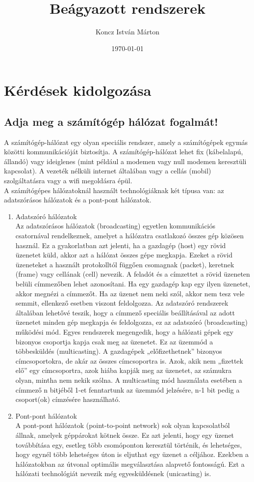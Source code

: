 \documentclass[12pt, a4paper]{article}
\begin{document}
\title{Beágyazott rendszerek}
\author{Koncz István Márton}
\date{\today}
\maketitle
\newpage

\section{Kérdések kidolgozása}
\subsection{Adja meg a számítógép hálózat fogalmát!}
A számítógép-hálózat egy olyan speciális rendszer, amely a számítógépek egymás közötti kommunikációját biztosítja. A számítógép-hálózat lehet fix (kábelalapú, állandó) vagy ideiglenes (mint például a modemen vagy null modemen keresztüli kapcsolat). A vezeték nélküli internet általában vagy a cellás (mobil) szolgáltatásra vagy a wifi megoldásra épül.\\
A számítógépes hálózatoknál használt technológiáknak két típusa van: az adatszórásos hálózatok és a pont-pont hálózatok.
\begin{enumerate}
\item
Adatszóró hálózatok\\
Az adatszórásos hálózatok (broadcasting) egyetlen kommunikációs csatornával rendelkeznek, amelyet a hálózatra csatlakozó összes gép közösen használ. Ez a gyakorlatban azt jelenti, ha a gazdagép (host) egy rövid üzenetet küld, akkor azt a hálózat összes gépe megkapja. Ezeket a rövid üzeneteket a használt protokolltól függően csomagnak (packet), keretnek (frame) vagy cellának (cell) nevezik. A feladót és a címzettet a rövid üzeneten belüli címmezőben lehet azonosítani. Ha egy gazdagép kap egy ilyen üzenetet, akkor megnézi a címmezőt. Ha az üzenet nem neki szól, akkor nem tesz vele semmit, ellenkező esetben viszont feldolgozza. Az adatszóró rendszerek általában lehetővé teszik, hogy a címmező speciális beállításával az adott üzenetet minden gép megkapja és feldolgozza, ez az adatszóró (broadcasting) működési mód. Egyes rendszerek megengedik, hogy a hálózati gépek egy bizonyos csoportja kapja csak meg az üzenetet. Ez az üzemmód a többesküldés (multicasting). A gazdagépek „előfizethetnek” bizonyos címcsoportokra, de akár az összes címcsoportra is. Azok, akik nem „fizettek elő” egy címcsoportra, azok hiába kapják meg az üzenetet, az számukra olyan, mintha nem nekik szólna. A multicasting mód használata esetében a címmező n bitjéből 1-et fenntartunk az üzemmód jelzésére, n-1 bit pedig a csoport(ok) címzésére használható.
\item
Pont-pont hálózatok\\
A pont-pont hálózatok (point-to-point network) sok olyan kapcsolatból állnak, amelyek géppárokat kötnek össze. Ez azt jelenti, hogy egy üzenet továbbítása egy, esetleg több csomóponton keresztül történik, és lehetséges, hogy egynél több lehetséges úton is eljuthat egy üzenet a céljához. Ezekben a hálózatokban az útvonal optimális megválasztása alapvető fontosságú. Ezt a hálózati technológiát nevezik még egyesküldésnek (unicasting) is.
\end{enumerate}
\end{document}
